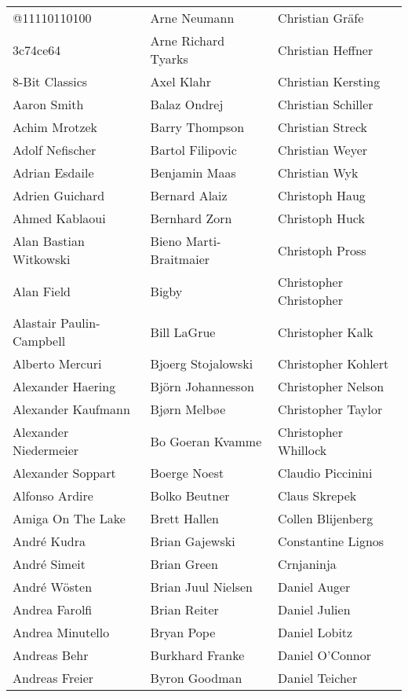 \begin{small}
\setlength{\tabcolsep}{1mm}
\begin{tabular}{p{4cm}p{4cm}p{4cm}}
@11110110100 & Arne Neumann & Christian Gräfe \\
3c74ce64 & Arne Richard Tyarks & Christian Heffner \\
8-Bit Classics & Axel Klahr & Christian Kersting \\
Aaron Smith & Balaz Ondrej & Christian Schiller \\
Achim Mrotzek & Barry Thompson & Christian Streck \\
Adolf Nefischer & Bartol Filipovic & Christian Weyer \\
Adrian Esdaile & Benjamin Maas & Christian Wyk \\
Adrien Guichard & Bernard Alaiz & Christoph Haug \\
Ahmed Kablaoui & Bernhard Zorn & Christoph Huck \\
Alan Bastian Witkowski & Bieno Marti-Braitmaier & Christoph Pross \\
Alan Field & Bigby & Christopher Christopher \\
Alastair Paulin-Campbell & Bill LaGrue & Christopher Kalk \\
Alberto Mercuri & Bjoerg Stojalowski & Christopher Kohlert \\
Alexander Haering & Björn Johannesson & Christopher Nelson \\
Alexander Kaufmann & Bjørn Melbøe & Christopher Taylor \\
Alexander Niedermeier & Bo Goeran Kvamme & Christopher Whillock \\
Alexander Soppart & Boerge Noest & Claudio Piccinini \\
Alfonso Ardire & Bolko Beutner & Claus Skrepek \\
Amiga On The Lake & Brett Hallen & Collen Blijenberg \\
André Kudra & Brian Gajewski & Constantine Lignos \\
André Simeit & Brian Green & Crnjaninja \\
André Wösten & Brian Juul Nielsen & Daniel Auger \\
Andrea Farolfi & Brian Reiter & Daniel Julien \\
Andrea Minutello & Bryan Pope & Daniel Lobitz \\
Andreas Behr & Burkhard Franke & Daniel O'Connor \\
Andreas Freier & Byron Goodman & Daniel Teicher \\

\end{tabular}
\end{small}
